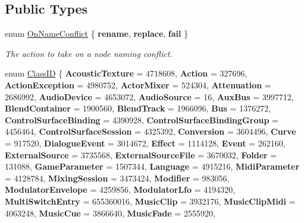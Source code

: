 \subsection*{Public Types}
\begin{DoxyCompactItemize}
\item 
enum \mbox{\hyperlink{class_waapi_c_s_1_1_custom_values_1_1_wwise_values_a672159d5ad63bd0a752a5607f4ad6cd9}{On\+Name\+Conflict}} \{ {\bfseries rename}, 
{\bfseries replace}, 
{\bfseries fail}
 \}
\begin{DoxyCompactList}\small\item\em The action to take on a node naming conflict. \end{DoxyCompactList}\item 
enum \mbox{\hyperlink{class_waapi_c_s_1_1_custom_values_1_1_wwise_values_a9daaf3673fa43ad853a6dfb0c8964881}{Class\+ID}} \{ \newline
{\bfseries Acoustic\+Texture} = 4718608, 
{\bfseries Action} = 327696, 
{\bfseries Action\+Exception} = 4980752, 
{\bfseries Actor\+Mixer} = 524304, 
\newline
{\bfseries Attenuation} = 2686992, 
{\bfseries Audio\+Device} = 4653072, 
{\bfseries Audio\+Source} = 16, 
{\bfseries Aux\+Bus} = 3997712, 
\newline
{\bfseries Blend\+Container} = 1900560, 
{\bfseries Blend\+Track} = 1966096, 
{\bfseries Bus} = 1376272, 
{\bfseries Control\+Surface\+Binding} = 4390928, 
\newline
{\bfseries Control\+Surface\+Binding\+Group} = 4456464, 
{\bfseries Control\+Surface\+Session} = 4325392, 
{\bfseries Conversion} = 3604496, 
{\bfseries Curve} = 917520, 
\newline
{\bfseries Dialogue\+Event} = 3014672, 
{\bfseries Effect} = 1114128, 
{\bfseries Event} = 262160, 
{\bfseries External\+Source} = 3735568, 
\newline
{\bfseries External\+Source\+File} = 3670032, 
{\bfseries Folder} = 131088, 
{\bfseries Game\+Parameter} = 1507344, 
{\bfseries Language} = 4915216, 
\newline
{\bfseries Midi\+Parameter} = 4128784, 
{\bfseries Mixing\+Session} = 3473424, 
{\bfseries Modifier} = 983056, 
{\bfseries Modulator\+Envelope} = 4259856, 
\newline
{\bfseries Modulator\+Lfo} = 4194320, 
{\bfseries Multi\+Switch\+Entry} = 655360016, 
{\bfseries Music\+Clip} = 3932176, 
{\bfseries Music\+Clip\+Midi} = 4063248, 
\newline
{\bfseries Music\+Cue} = 3866640, 
{\bfseries Music\+Fade} = 2555920, 

\end{DoxyCompactItemize}
